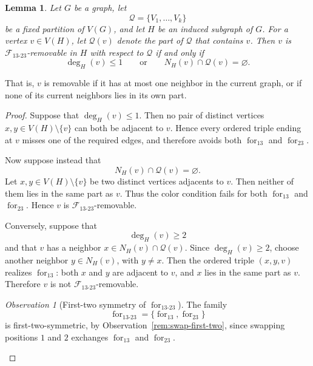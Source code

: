 \documentclass[12pt]{article}
\theoremstyle{plain}
\newtheorem{lemma}[theorem]{Lemma}
\theoremstyle{definition}
\theoremstyle{remark}
\newtheorem{observation}[theorem]{Observation}
\theoremstyle{definition}
\newcommand{\forlabel}{\mathrm{for}}
\DeclareRobustCommand{\forparam}[1]{%
  \ensuremath{\mathop{\forlabel}\nolimits_{#1}}%
}
\begin{document}
\begin{lemma}\label{lem:removable-for13-23}
Let \(G\) be a graph, let
\[
\mathcal Q=\{V_1,\dots,V_k\}
\]
be a fixed partition of \(V(G)\), and let \(H\) be an induced subgraph of \(G\).
For a vertex \(v\in V(H)\), let \(\mathcal Q(v)\) denote the part of \(\mathcal Q\) that contains \(v\).
Then \(v\) is \(\mathcal F_{13\text{-}23}\)-removable in \(H\) with respect to \(\mathcal Q\) if and only if
\[
\deg_H(v)\le 1
\qquad\text{or}\qquad
N_H(v)\cap \mathcal Q(v)=\varnothing.
\]
\end{lemma}

That is, \(v\) is removable if it has at most one neighbor in the current graph, or if none of its current neighbors
lies in its own part. 


\begin{proof}
Suppose that \(\deg_H(v)\le 1\). Then no pair of distinct vertices \(x,y\in V(H)\setminus\{v\}\) can both be
adjacent to \(v\). Hence every ordered triple ending at \(v\) misses one of the required edges, and therefore avoids
both \(\operatorname{for}_{13}\) and \(\operatorname{for}_{23}\).

Now suppose instead that
\[
N_H(v)\cap \mathcal Q(v)=\varnothing.
\]
Let \(x,y\in V(H)\setminus\{v\}\) be two distinct vertices adjacents to \(v\). Then neither of them lies in the same part as \(v\).
Thus the color condition fails for both \(\operatorname{for}_{13}\) and \(\operatorname{for}_{23}\). Hence \(v\) is
\(\mathcal F_{13\text{-}23}\)-removable.

Conversely, suppose that
\[
\deg_H(v)\ge 2
\]
and that \(v\) has a neighbor \(x\in N_H(v)\cap \mathcal Q(v)\). Since \(\deg_H(v)\ge 2\), choose another neighbor
\(y\in N_H(v)\), with \(y\neq x\). Then the ordered triple \((x,y,v)\) realizes \(\operatorname{for}_{13}\): both
\(x\) and \(y\) are adjacent to \(v\), and \(x\) lies in the same part as \(v\). Therefore \(v\) is not
\(\mathcal F_{13\text{-}23}\)-removable.



\begin{observation}[First-two symmetry of \(\forparam{13\text{-}23}\)]
\label{obs:for13-23-first-two-symmetric}
The family
\[
\forparam{13\text{-}23}
=
\{\forparam{13},\forparam{23}\}
\]
is first-two-symmetric, by Observation~\ref{rem:swap-first-two}, since swapping positions \(1\) and \(2\)
exchanges \(\forparam{13}\) and \(\forparam{23}\).
\end{observation}





\end{proof}
\end{document}
